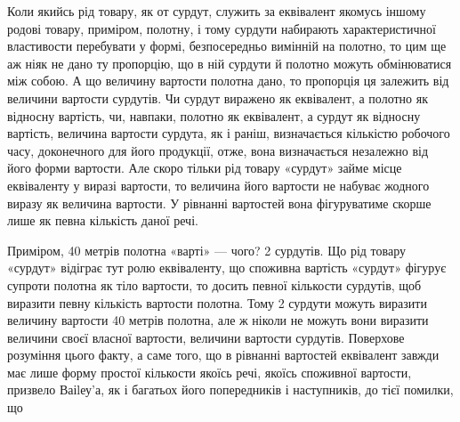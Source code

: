 Коли якийсь рід товару, як от сурдут, служить за еквівалент якомусь іншому родові товару, приміром,
полотну, і тому сурдути набирають характеристичної властивости перебувати у формі, безпосередньо
вимінній на полотно, то цим ще аж ніяк не дано ту пропорцію, що в ній сурдути й полотно можуть
обмінюватися між собою. А що величину вартости полотна дано, то пропорція ця залежить від величини
вартости сурдутів. Чи сурдут виражено як еквівалент, а полотно як відносну вартість, чи, навпаки,
полотно як еквівалент, а сурдут як відносну вартість, величина вартости сурдута, як і раніш,
визначається кількістю робочого часу, доконечного для його продукції, отже, вона  визначається
незалежно від його форми вартости. Але скоро тільки рід товару «сурдут» займе місце еквіваленту у
виразі вартости, то величина його вартости не набуває жодного виразу як величина вартости. У
рівнанні вартостей вона фігуруватиме скорше лише як певна кількість даної речі.

Приміром, 40 метрів полотна «варті» — чого? 2 сурдутів. Що рід товару «сурдут» відіграє тут ролю
еквіваленту, що споживна вартість «сурдут» фігурує супроти полотна як тіло вартости, то досить
певної кількости сурдутів, щоб виразити певну кількість вартости полотна. Тому 2 сурдути можуть
виразити величину вартости 40 метрів полотна, але ж ніколи не можуть вони виразити величини своєї
власної вартости, величини вартости сурдутів. Поверхове розуміння цього факту, а саме того, що в
рівнанні вартостей еквівалент завжди має лише форму простої кількости якоїсь речі, якоїсь споживної
вартости, призвело Ваіlеу’а, як і багатьох його попередників і наступників, до тієї помилки, що
\parbreak{}  %
